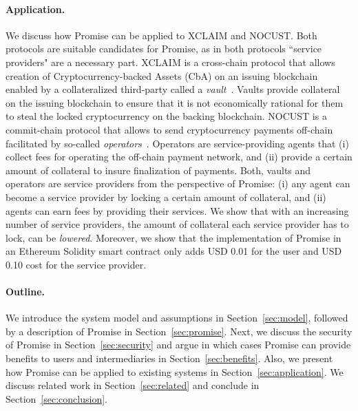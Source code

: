 \documentclass[runningheads]{llncs}
\newcommand{\sys}{Promise\xspace}
\begin{document}
\paragraph{Application.}
We discuss how \sys can be applied to XCLAIM and NOCUST.
Both protocols are suitable candidates for \sys, as in both protocols ``service providers" are a necessary part.
XCLAIM is a cross-chain protocol that allows creation of Cryptocurrency-backed Assets (CbA) on an issuing blockchain enabled by a collateralized third-party called a \emph{vault}~\cite{Zamyatin2019XCLAIM}.
Vaults provide collateral on the issuing blockchain to ensure that it is not economically rational for them to steal the locked cryptocurrency on the backing blockchain.
NOCUST is a commit-chain protocol that allows to send cryptocurrency payments off-chain facilitated by so-called \emph{operators}~\cite{Khalil2019NOCUST}.
Operators are service-providing agents that (i) collect fees for operating the off-chain payment network, and (ii) provide a certain amount of collateral to insure finalization of payments.
Both, vaults and operators are service providers from the perspective of \sys: (i) any agent can become a service provider by locking a certain amount of collateral, and (ii) agents can earn fees by providing their services. 
We show that with an increasing number of service providers, the amount of collateral each service provider has to lock, can be \emph{lowered}.
Moreover, we show that the implementation of \sys in an Ethereum Solidity smart contract only adds USD 0.01 for the user and USD 0.10 cost for the service provider.

\paragraph{Outline.}
We introduce the system model and assumptions in Section~\ref{sec:model}, followed by a description of \sys in Section~\ref{sec:promise}.
Next, we discuss the security of \sys in Section~\ref{sec:security} and argue in which cases \sys can provide benefits to users and intermediaries in Section~\ref{sec:benefits}.
Also, we present how \sys can be applied to existing systems in Section~\ref{sec:application}.
We discuss related work in Section~\ref{sec:related} and conclude in Section~\ref{sec:conclusion}.
\end{document}
